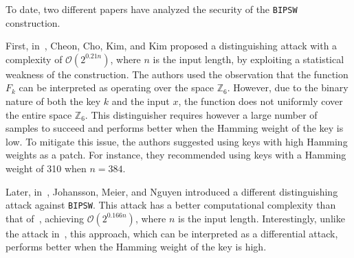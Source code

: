 To date, two different papers have analyzed the security of the {\tt BIPSW} construction.

First, in~\cite{PKC:CCKK21}, Cheon, Cho, Kim, and Kim proposed a distinguishing attack with a complexity of $\mathcal{O}(2^{0.21n})$, where $n$ is the input length, by exploiting a statistical weakness of the construction. The authors used the observation that the function $F_k$ can be interpreted as operating over the space $\mathbb{Z}_6$. However, due to the binary nature of both the key $k$ and the input $x$, the function does not uniformly cover the entire space $\mathbb{Z}_6$. This distinguisher requires however a large number of samples to succeed and performs better when the Hamming weight of the key is low. To mitigate this issue, the authors suggested using keys with high Hamming weights as a patch. For instance, they recommended using keys with a Hamming weight of 310 when $n = 384$.

Later, in~\cite{JMN23}, Johansson, Meier, and Nguyen introduced a different distinguishing attack against {\tt BIPSW}. This attack has a better computational complexity than that of~\cite{PKC:CCKK21}, achieving $\mathcal{O}(2^{0.166n})$, where $n$ is the input length. Interestingly, unlike the attack in~\cite{PKC:CCKK21}, this approach, which can be interpreted as a differential attack, performs better when the Hamming weight of the key is high.



